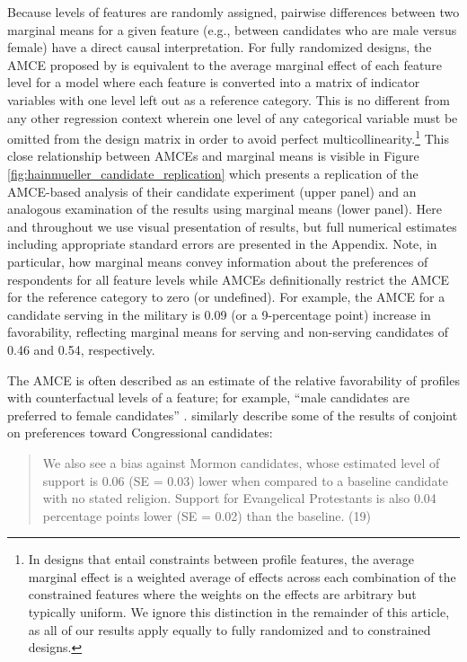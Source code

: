 \documentclass[a4paper,12pt]{article}\usepackage[]{graphicx}\usepackage[]{color}
\begin{document}
Because levels of features are randomly assigned, pairwise differences between two marginal means for a given feature (e.g., between candidates who are male versus female) have a direct causal interpretation. For fully randomized designs, the AMCE proposed by \citet{HainmuellerHopkinsYamamoto2014} is equivalent to the average marginal effect of each feature level for a model where each feature is converted into a matrix of indicator variables with one level left out as a reference category. This is no different from any other regression context wherein one level of any categorical variable must be omitted from the design matrix in order to avoid perfect multicollinearity.\footnote{In designs that entail constraints between profile features, the average marginal effect is a weighted average of effects across each combination of the constrained features where the weights on the effects are arbitrary but typically uniform. We ignore this distinction in the remainder of this article, as all of our results apply equally to fully randomized and to constrained designs.} This close relationship between AMCEs and marginal means is visible in Figure \ref{fig:hainmueller_candidate_replication} which presents a replication of the AMCE-based analysis of their candidate experiment (upper panel) and an analogous examination of the results using marginal means (lower panel). Here and throughout we use visual presentation of results, but full numerical estimates including appropriate standard errors are presented in the Appendix. Note, in particular, how marginal means convey information about the preferences of respondents for all feature levels while AMCEs definitionally restrict the AMCE for the reference category to zero (or undefined). For example, the AMCE for a candidate serving in the military is 0.09 (or a 9-percentage point) increase in favorability, reflecting marginal means for serving and non-serving candidates of 0.46 and 0.54, respectively.

The AMCE is often described as an estimate of the relative favorability of profiles with counterfactual levels of a feature; for example, ``male candidates are preferred to female candidates'' \citep[6]{TeeleKallaRosenbluth2018}. \citet{HainmuellerHopkinsYamamoto2014} similarly describe some of the results of conjoint on preferences toward Congressional candidates:

\begin{quote}
We also see a bias against Mormon candidates, whose estimated level of support is 0.06 (SE = 0.03) lower when compared to a baseline candidate with no stated religion. Support for Evangelical Protestants is also 0.04 percentage points lower (SE = 0.02) than the baseline. (19)
\end{quote}
\end{document}
